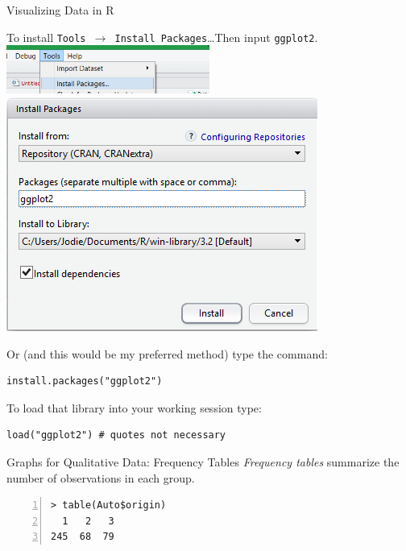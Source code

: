 \documentclass[xcolor=svgnames, 10pt, handout]{beamer}
\begin{document}
\begin{frame}[fragile]{Visualizing Data in R}

To install \texttt{Tools $\to$ Install Packages}\ldots Then input \verb|ggplot2|.
\includegraphics[width=0.5\textwidth]{images/debug}
\includegraphics[width=.4\textwidth]{images/installpackage}

Or (and this would be my preferred method) type the command:
\begin{Verbatim}[label=Install package]
install.packages("ggplot2")
\end{Verbatim}
To load that library into your working session type:
\begin{Verbatim}[label=load package]
load("ggplot2") # quotes not necessary
\end{Verbatim}

\end{frame}


\begin{frame}[fragile]{Graphs for Qualitative Data: Frequency Tables}
\emph{Frequency tables} summarize the number of observations in each group.
\vfill
\begin{Verbatim}[xleftmargin=2em, xrightmargin=1.5em, frame=single, numbers=left, label=Frequency Table, framesep=0.5em]
> table(Auto$origin)
  1   2   3
245  68  79
\end{Verbatim}
\vfill
\end{frame}
\end{document}
